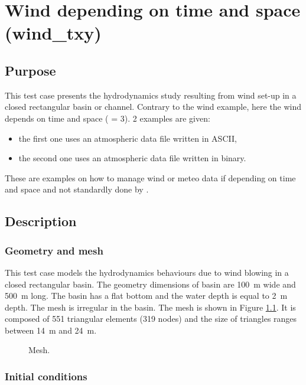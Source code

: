 \chapter{Wind depending on time and space (wind\_txy)}
%
\section{Purpose}

This test case presents the hydrodynamics study resulting from wind set-up in a
closed rectangular basin or channel.
Contrary to the wind example, here the wind depends on time and space
( = 3).
2 examples are given:
\begin{itemize}
\item the first one uses an atmospheric data file written in ASCII,
\item the second one uses an atmospheric data file written in binary.
\end{itemize}
These are examples on how to manage wind or meteo data if depending on time
and space and not standardly done by .

\section{Description}

\subsection{Geometry and mesh}

This test case models the hydrodynamics behaviours due to wind blowing 
in a closed rectangular basin. The geometry dimensions of basin are 100~m wide 
and  500~m long. The basin has a flat bottom and the water depth is equal to 2~m depth. 
The mesh is irregular in the basin. The mesh is shown in Figure \ref{t2d:windtxy:fig:mesh}. 
It is composed of 551 triangular elements (319 nodes) and the size of triangles
ranges between 14~m and 24~m.

\begin{figure}[!htbp]
 \centering
 \caption{Mesh.}
 \label{t2d:windtxy:fig:mesh}
\end{figure}

\subsection{Initial conditions}

